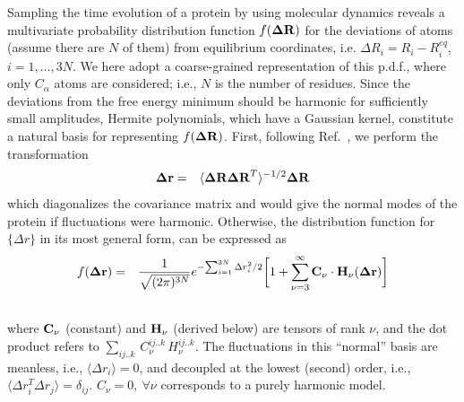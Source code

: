 \documentclass{article}
\begin{document}
Sampling the time evolution of a protein by using molecular dynamics
reveals a multivariate probability distribution function $f({\bf\Delta
  R})$ for the deviations of atoms (assume there are $N$ of them) from
equilibrium coordinates, i.e. $\Delta R_i = R_i - R_i^{eq}$,
$i=1,\dots,3N$. We here adopt a coarse-grained representation of this
p.d.f., where only $C_\alpha$ atoms are considered; i.e., $N$ is the
number of residues. Since the deviations from the free energy minimum
should be harmonic for sufficiently small amplitudes, Hermite
polynomials, which have a Gaussian kernel, constitute a natural basis
for representing $f({\bf\Delta R})$. First, following
Ref.~\cite{Yogurtcu}, we perform the transformation
\begin{eqnarray}
\label{transformation}
{\bf \Delta r} &=& \langle {\bf\Delta R \Delta R}^T\rangle ^{-1/2} {\bf
  \Delta R}
\end{eqnarray}
which diagonalizes the covariance matrix and would give the normal
modes of the protein if fluctuations were harmonic. Otherwise, the
distribution function for $\{\Delta r\}$ in its most general form, can
be expressed as~\cite{Flory}
\begin{eqnarray}
f({\bf\Delta r}) &=& \frac{1}{\sqrt{(2\pi)^{3N}}} e^{
    -{\sum_{i=1}^{3N} \Delta r_i^2}/2} \bigg[ 1 +  \sum_{\nu=3}^\infty
 {\bf C_\nu}\cdot {\bf H}_\nu({\bf \Delta r}) \bigg] \nonumber \\
&& \label{hermite_expansion}
\end{eqnarray}
where ${\bf C}_\nu$ (constant) and ${\bf H}_\nu$ (derived below) are
tensors of rank $\nu$, and the dot product refers to
$\sum_{ij..k}\,C_\nu^{ij..k}\,H_\nu^{ij..k}$.  The fluctuations in
this ``normal'' basis are meanless, i.e., $\langle {\Delta r_i}\rangle
= 0$, and decoupled at the lowest (second) order, i.e., $ \langle {
  \Delta r_i^T \Delta r_j}\rangle = \delta_{ij}$. $C_\nu = 0,\ \forall \nu$
corresponds to a purely harmonic model.
\end{document}
